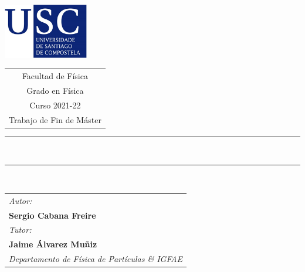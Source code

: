 \documentclass[12 pt, a4paper]{article} %
\numberwithin{equation}{section}
\numberwithin{figure}{section}
\numberwithin{table}{section}
\begin{document}
	\begin{center}
		\vspace{3em}
		\includegraphics[width=10em]{figures/USC.png}
		\hspace{1cm}
		\begin{tabular}[b]{c}
			{\large\color{usc} \sc Facultad de Física} \vspace{0.5em}\\
			{\large\color{usc} \sc Grado en Física } \vspace{0.5em}\\  %
			{\large\color{usc}  Curso 2021-22} \vspace{0.5em}\\%
			{\Large\color{usc} \sc Trabajo de Fin de Máster} %
		\end{tabular}
		
		
		
		\vspace{3cm}
		\rule{65mm}{0.2mm}\\
		\vspace{1cm}
		
		{\sc\LARGE \TituloDoTraballo}
		
		{\sl\large \EspecialidadeMaster}
		
		
		
		\vspace{0.5cm}
		\rule{65mm}{0.2mm}\\
		\vspace{2cm}
	\end{center}
	
	
	\begin{tabular}{l}
		{\sl\large Autor:} \\
		{\bf\Large Sergio Cabana Freire} %
		\vspace{1em}\mbox{} \\
		{\sl\large Tutor:} \\
		{\bf\large Jaime Álvarez Muñiz} \\
		{\sl\large Departamento de Física de Partículas \& IGFAE}
		\vspace{1em}\mbox{} \\
	\end{tabular}
	
\end{document}
